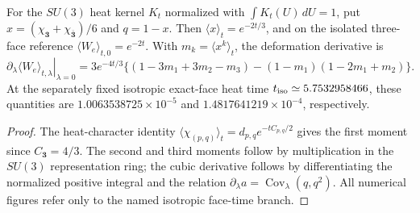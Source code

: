 \documentclass[12pt,a4paper]{article}
\begin{document}
\begin{proposition}
\label{p13:prop:v3025-character-moment-certificate}
For the $SU(3)$ heat kernel $K_t$ normalized with
$\int K_t(U)\,dU=1$, put
$x=(\chi_{\mathbf3}+\chi_{\overline{\mathbf3}})/6$ and $q=1-x$.
Then $\langle x\rangle_t=e^{-2t/3}$, and on the isolated three-face
reference $\langle W_e\rangle_{t,0}=e^{-2t}$.  With
$m_k=\langle x^k\rangle_t$, the deformation derivative is
\[
 \left.\partial_\lambda\langle W_e\rangle_{t,\lambda}
 \right|_{\lambda=0}
 =3e^{-4t/3}\{(1-3m_1+3m_2-m_3)
 -(1-m_1)(1-2m_1+m_2)\}.
\]
At the separately fixed isotropic exact-face heat time
$t_{\rm iso}\simeq 5.7532958466$, these quantities are
$1.0063538725\times10^{-5}$ and
$1.4817641219\times10^{-4}$, respectively.
\end{proposition}
\begin{proof}
The heat-character identity
$\langle\chi_{(p,q)}\rangle_t
=d_{p,q}e^{-tC_{p,q}/2}$ gives the first moment since
$C_{\mathbf3}=4/3$.  The second and third moments follow by
multiplication in the $SU(3)$ representation ring; the cubic
derivative follows by differentiating the normalized positive
integral and the relation $\partial_\lambda a=
\operatorname{Cov}_\lambda(q,q^2)$.  All numerical figures refer
only to the named isotropic face-time branch.
\end{proof}
\end{document}
